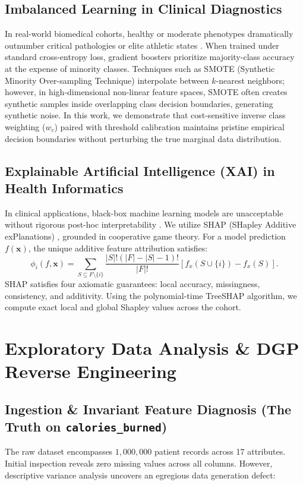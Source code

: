 \documentclass[11pt,a4paper]{article}
\begin{document}
\subsection{Imbalanced Learning in Clinical Diagnostics}
In real-world biomedical cohorts, healthy or moderate phenotypes dramatically outnumber critical pathologies or elite athletic states \citep{he2009}. When trained under standard cross-entropy loss, gradient boosters prioritize majority-class accuracy at the expense of minority classes. Techniques such as SMOTE (Synthetic Minority Over-sampling Technique) \citep{chawla2002} interpolate between $k$-nearest neighbors; however, in high-dimensional non-linear feature spaces, SMOTE often creates synthetic samples inside overlapping class decision boundaries, generating synthetic noise. In this work, we demonstrate that cost-sensitive inverse class weighting ($w_c$) paired with threshold calibration maintains pristine empirical decision boundaries without perturbing the true marginal data distribution.

\subsection{Explainable Artificial Intelligence (XAI) in Health Informatics}
In clinical applications, black-box machine learning models are unacceptable without rigorous post-hoc interpretability \citep{amann2020}. We utilize SHAP (SHapley Additive exPlanations) \citep{lundberg2017}, grounded in cooperative game theory. For a model prediction $f(\mathbf{x})$, the unique additive feature attribution satisfies:
\begin{equation}
\phi_i(f, \mathbf{x}) = \sum_{S \subseteq F \setminus \{i\}} \frac{|S|! (|F| - |S| - 1)!}{|F|!} \left[ f_x(S \cup \{i\}) - f_x(S) \right].
\end{equation}
SHAP satisfies four axiomatic guarantees: local accuracy, missingness, consistency, and additivity. Using the polynomial-time TreeSHAP algorithm, we compute exact local and global Shapley values across the cohort.

\section{Exploratory Data Analysis \& DGP Reverse Engineering}

\subsection{Ingestion \& Invariant Feature Diagnosis (The Truth on \texttt{calories\_burned})}
The raw dataset encompasses $1{,}000{,}000$ patient records across 17 attributes. Initial inspection reveals zero missing values across all columns. However, descriptive variance analysis uncovers an egregious data generation defect:
\end{document}
